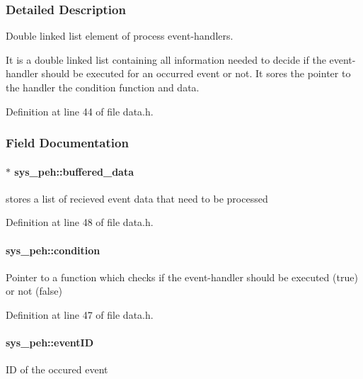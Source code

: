 \subsubsection{Detailed Description}
Double linked list element of process event-\/handlers. 

It is a double linked list containing all information needed to decide if the event-\/handler should be executed for an occurred event or not. It sores the pointer to the handler the condition function and data. 

Definition at line 44 of file data.\+h.



\subsubsection{Field Documentation}
\hypertarget{structsys__peh_ab9909d1cf3fca775e314682ef25ae132}{}
\paragraph[{buffered\+\_\+data}]{$\ast$ sys\+\_\+peh\+::buffered\+\_\+data}\label{structsys__peh_ab9909d1cf3fca775e314682ef25ae132}
stores a list of recieved event data that need to be processed 

Definition at line 48 of file data.\+h.

\hypertarget{structsys__peh_ac6054670e82aec5a0bfef3b7e114c9e5}{}
\paragraph[{condition}]{ sys\+\_\+peh\+::condition}\label{structsys__peh_ac6054670e82aec5a0bfef3b7e114c9e5}
Pointer to a function which checks if the event-\/handler should be executed (true) or not (false) 

Definition at line 47 of file data.\+h.

\hypertarget{structsys__peh_a7d9fce797a1666da32c8f76d8c748132}{}
\paragraph[{event\+I\+D}]{ sys\+\_\+peh\+::event\+I\+D}\label{structsys__peh_a7d9fce797a1666da32c8f76d8c748132}
I\+D of the occured event 

